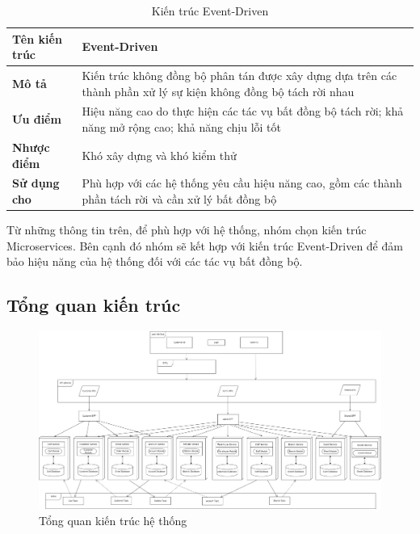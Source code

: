 \begin{table}[h]
    \begin{tabular}{|p{3cm}|p{12cm}|}
        \hline
        \textbf{Tên kiến trúc} & Event-Driven\\
        \hline
        \textbf{Mô tả}         & Kiến trúc không đồng bộ phân tán được xây dựng dựa trên các thành phần xử lý sự kiện không đồng bộ tách rời nhau \\
        \hline
        \textbf{Ưu điểm}       & Hiệu năng cao do thực hiện các tác vụ bất đồng bộ tách rời; khả năng mở rộng cao; khả năng chịu lỗi tốt \\
        \hline
        \textbf{Nhược điểm}    & Khó xây dựng và khó kiểm thử \\
        \hline
        \textbf{Sử dụng cho}   & Phù hợp với các hệ thống yêu cầu hiệu năng cao, gồm các thành phần tách rời và cần xử lý bất đồng bộ \\
        \hline
    \end{tabular}
    \caption{Kiến trúc Event-Driven}
\end{table}
 
 
Từ những thông tin trên, để phù hợp với hệ thống, nhóm chọn kiến trúc Microservices. Bên cạnh đó nhóm sẽ kết hợp với kiến trúc Event-Driven để đảm bảo hiệu năng của hệ thống đối với các tác vụ bất đồng bộ.

\subsection{Tổng quan kiến trúc}
 
\begin{figure}[!htp]
    \centering
    \includegraphics[width=18cm]{img/Architecture/general-architect.png}
    \newline
    \caption{Tổng quan kiến trúc hệ thống}
\end{figure}
 
